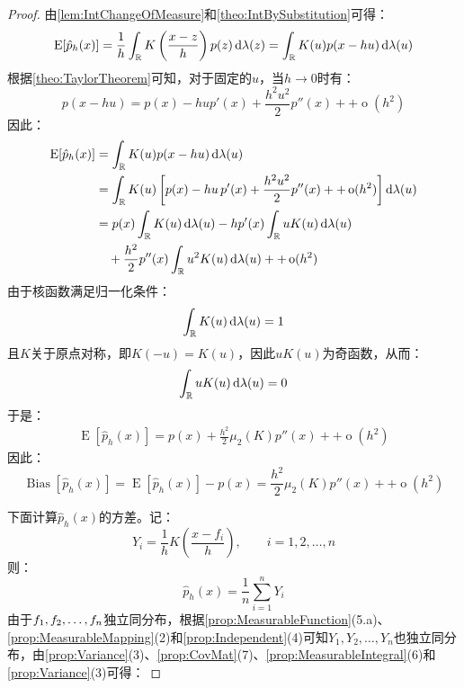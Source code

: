 \begin{proof}
	由\cref{lem:IntChangeOfMeasure}和\cref{theo:IntBySubstitution}可得：
	\begin{equation*}
		\operatorname{E}[\hat{p}_h(x)]=\frac{1}{h}\int_{\mathbb{R}}K\left(\frac{x-z}{h}\right)p(z)\mathop{}\!\mathrm{d}\lambda(z)=\int_{\mathbb{R}}K(u)p(x-hu)\mathop{}\!\mathrm{d}\lambda(u)
	\end{equation*}
	根据\cref{theo:TaylorTheorem}可知，对于固定的$u$，当$h\to0$时有：
	\begin{equation*}
		p(x-hu)=p(x)-hup'(x)+\frac{h^2u^2}{2}p''(x)++\operatorname{o}(h^2)
	\end{equation*}
	因此：
	\begin{align*}
		\operatorname{E}[\hat{p}_h(x)]&=\int_{\mathbb{R}}K(u)p(x-hu)\mathop{}\!\mathrm{d}\lambda(u) \\
		&=\int_{\mathbb{R}}K(u)\left[p(x)-hu\,p'(x)+\frac{h^2u^2}{2}p''(x)++\operatorname{o}(h^2)\right]\mathop{}\!\mathrm{d}\lambda(u) \\
		&=p(x)\int_{\mathbb{R}}K(u)\mathop{}\!\mathrm{d}\lambda(u)-hp'(x)\int_{\mathbb{R}}uK(u)\mathop{}\!\mathrm{d}\lambda(u) \\
		&\quad+\frac{h^2}{2}p''(x)\int_{\mathbb{R}}u^2K(u)\mathop{}\!\mathrm{d}\lambda(u)++\operatorname{o}(h^2)
	\end{align*}
	由于核函数满足归一化条件：
	\begin{equation*}
		\int_{\mathbb{R}}K(u)\mathop{}\!\mathrm{d}\lambda(u)=1
	\end{equation*}
	且$K$关于原点对称，即$K(-u)=K(u)$，因此$uK(u)$为奇函数，从而：
	\begin{equation*}
		\int_{\mathbb{R}}uK(u)\mathop{}\!\mathrm{d}\lambda(u)=0
	\end{equation*}
	于是：
	\begin{align*}
		\operatorname{E}[\hat{p}_h(x)]=p(x)+\frac{h^2}{2}\mu_2(K)p''(x)++\operatorname{o}(h^2)
	\end{align*}
	因此：
	\begin{equation*}
		\operatorname{Bias}[\hat{p}_h(x)]=\operatorname{E}[\hat{p}_h(x)]-p(x)=\frac{h^2}{2}\mu_2(K)p''(x)++\operatorname{o}(h^2)
	\end{equation*}\par
	下面计算$\hat{p}_h(x)$的方差。记：
	\begin{equation*}
		Y_i=\frac{1}{h}K\left(\frac{x-f_i}{h}\right),\qquad i=1,2,\dots,n
	\end{equation*}
	则：
	\begin{equation*}
		\hat{p}_h(x)=\frac{1}{n}\sum_{i=1}^nY_i
	\end{equation*}
	由于$f_1, f_2, \dots, f_{n}$独立同分布，根据\cref{prop:MeasurableFunction}(5.a)、\cref{prop:MeasurableMapping}(2)和\cref{prop:Independent}(4)可知$Y_1,Y_2,\dots,Y_n$也独立同分布，由\cref{prop:Variance}(3)、\cref{prop:CovMat}(7)、\cref{prop:MeasurableIntegral}(6)和\cref{prop:Variance}(3)可得：

\end{proof}
